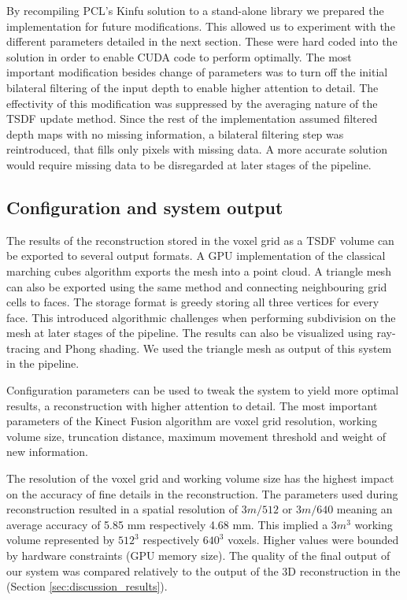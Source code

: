 \documentclass{ucl_thesis}
\newcommand{\secref}[1]{(Section \ref{#1})}
\begin{document}
\par By recompiling PCL's Kinfu solution to a stand-alone library we prepared the implementation for future modifications. This allowed us to experiment with the different parameters detailed in the next section. These were hard coded into the solution in order to enable CUDA code to perform optimally. The most important modification besides change of parameters was to turn off the initial bilateral filtering of the input depth to enable higher attention to detail. The effectivity of this modification was suppressed by the averaging nature of the TSDF update method. Since the rest of the implementation assumed filtered depth maps with no missing information, a bilateral filtering step was reintroduced, that fills only pixels with missing data. A more accurate solution would require missing data to be disregarded at later stages of the pipeline.

\subsection{Configuration and system output}
\label{sec:3d_sys_output}

The results of the reconstruction stored in the voxel grid as a TSDF volume can be exported to several output formats. A GPU implementation of the classical marching cubes algorithm \citep{Lorensen:1987} exports the mesh into a point cloud. A triangle mesh can also be exported using the same method and connecting neighbouring grid cells to faces. The storage format is greedy storing all three vertices for every face. This introduced algorithmic challenges when performing subdivision on the mesh at later stages of the pipeline. The results can also be visualized using ray-tracing and Phong shading. We used the triangle mesh as output of this system in the pipeline.

\par Configuration parameters can be used to tweak the system to yield more optimal results, a reconstruction with higher attention to detail. The most important parameters of the Kinect Fusion algorithm are voxel grid resolution, working volume size, truncation distance, maximum movement threshold and weight of new information.

\par The resolution of the voxel grid and working volume size has the highest impact on the accuracy of fine details in the reconstruction. The parameters used during reconstruction resulted in a spatial resolution of $3 m / 512$ or $3 m / 640$ meaning an average accuracy of 5.85 mm respectively 4.68 mm. This implied a $3m^3$ working volume represented by $512^3$ respectively $640^3$ voxels. Higher values were bounded by hardware constraints (GPU memory size). The quality of the final output of our system was compared relatively to the output of the 3D reconstruction in the \secref{sec:discussion_results}.
\end{document}
